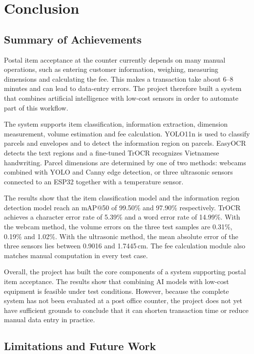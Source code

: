 \chapter{Conclusion}
\label{chap:conclusion}

\section{Summary of Achievements}

Postal item acceptance at the counter currently depends on many manual operations, such as entering customer information, weighing, measuring dimensions and calculating the fee. This makes a transaction take about 6--8 minutes and can lead to data-entry errors. The project therefore built a system that combines artificial intelligence with low-cost sensors in order to automate part of this workflow.

The system supports item classification, information extraction, dimension measurement, volume estimation and fee calculation. YOLO11n is used to classify parcels and envelopes and to detect the information region on parcels. EasyOCR detects the text regions and a fine-tuned TrOCR recognizes Vietnamese handwriting. Parcel dimensions are determined by one of two methods: webcams combined with YOLO and Canny edge detection, or three ultrasonic sensors connected to an ESP32 together with a temperature sensor.

The results show that the item classification model and the information region detection model reach an mAP@50 of 99.50\% and 97.90\% respectively. TrOCR achieves a character error rate of 5.39\% and a word error rate of 14.99\%. With the webcam method, the volume errors on the three test samples are 0.31\%, 0.19\% and 1.02\%. With the ultrasonic method, the mean absolute error of the three sensors lies between 0.9016 and 1.7445\,cm. The fee calculation module also matches manual computation in every test case.

Overall, the project has built the core components of a system supporting postal item acceptance. The results show that combining AI models with low-cost equipment is feasible under test conditions. However, because the complete system has not been evaluated at a post office counter, the project does not yet have sufficient grounds to conclude that it can shorten transaction time or reduce manual data entry in practice.

\section{Limitations and Future Work}


